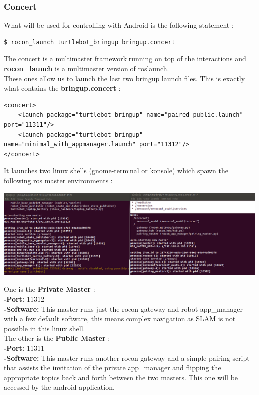 \documentclass[10pt,a4paper]{article}
\begin{document}
\subsubsection{Concert}

What will be used for controlling with Android is the following statement : 
\begin{lstlisting}[frame=single]
$ rocon_launch turtlebot_bringup bringup.concert
\end{lstlisting}


 The concert is a multimaster framework running on top of the interactions and \textbf{rocon\_launch} is a multimaster version of roslaunch.\\
 
These ones allow us to launch the last two bringup launch files.
This is exactly what contains the \textbf{bringup.concert} : 
\begin{lstlisting}[frame=single]
<concert>
    <launch package="turtlebot_bringup" name="paired_public.launch" port="11311"/>
    <launch package="turtlebot_bringup" name="minimal_with_appmanager.launch" port="11312"/>
</concert>
\end{lstlisting}

It launches two linux shells (gnome-terminal or konsole) which spawn the following ros master environments : 

\begin{center}
\includegraphics[scale=0.4]{images/twoMasters.png}
\end{center}

One is the \textbf{Private Master} : \\
\textbf{-Port:} 11312 \\
\textbf{-Software:} This master runs just the rocon gateway and robot app\_manager with a few default software, this means complex navigation as SLAM is not possible in this linux shell.\\

The other is the \textbf{Public Master} : \\
\textbf{-Port:} 11311 \\
\textbf{-Software:} This master runs another rocon gateway and a simple pairing script that assists the invitation of the private app\_manager and flipping the appropriate topics back and forth between the two masters. This one will be accessed by the android application.
\end{document}
